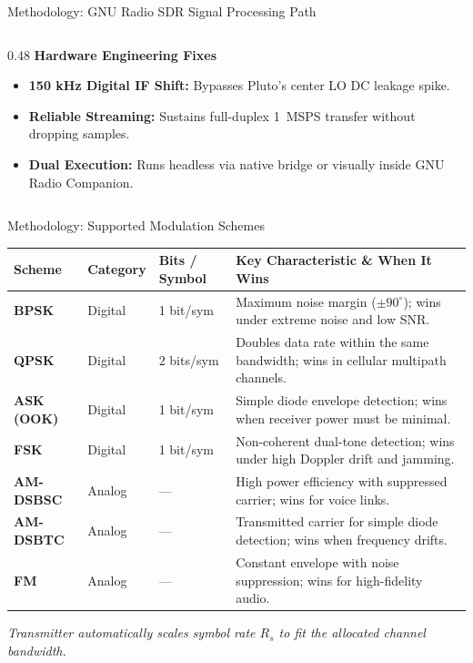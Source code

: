 \documentclass[aspectratio=169, 10pt]{beamer}
\begin{document}
\begin{frame}{Methodology: GNU Radio SDR Signal Processing Path}
\begin{columns}[T]
    \begin{column}{0.48\linewidth}
      \textbf{\color{primaryblue}\normalsize Hardware Engineering Fixes}\\[0.10cm]
      \begin{itemize}\setlength{\itemsep}{5pt}\small
        \item \textbf{150 kHz Digital IF Shift:} Bypasses Pluto's center LO DC leakage spike.
        \item \textbf{Reliable Streaming:} Sustains full-duplex 1~MSPS transfer without dropping samples.
        \item \textbf{Dual Execution:} Runs headless via native bridge or visually inside GNU Radio Companion.
      \end{itemize}
    \end{column}
  \end{columns}
\end{frame}

\begin{frame}{Methodology: Supported Modulation Schemes}
  \centering
  \small
  \begin{tabularx}{\textwidth}{p{2.2cm} p{1.6cm} p{1.6cm} X}
    \toprule
    \textbf{Scheme} & \textbf{Category} & \textbf{Bits / Symbol} & \textbf{Key Characteristic \& When It Wins} \\
    \midrule
    \textbf{BPSK} & Digital & 1 bit/sym & Maximum noise margin ($\pm 90^\circ$); wins under extreme noise and low SNR. \\
    \addlinespace
    \textbf{QPSK} & Digital & 2 bits/sym & Doubles data rate within the same bandwidth; wins in cellular multipath channels. \\
    \addlinespace
    \textbf{ASK (OOK)} & Digital & 1 bit/sym & Simple diode envelope detection; wins when receiver power must be minimal. \\
    \addlinespace
    \textbf{FSK} & Digital & 1 bit/sym & Non-coherent dual-tone detection; wins under high Doppler drift and jamming. \\
    \addlinespace
    \textbf{AM-DSBSC} & Analog & --- & High power efficiency with suppressed carrier; wins for voice links. \\
    \addlinespace
    \textbf{AM-DSBTC} & Analog & --- & Transmitted carrier for simple diode detection; wins when frequency drifts. \\
    \addlinespace
    \textbf{FM} & Analog & --- & Constant envelope with noise suppression; wins for high-fidelity audio. \\
    \bottomrule
  \end{tabularx}
  
  \vspace{0.35cm}
  \centering\small
  \textit{Transmitter automatically scales symbol rate $R_s$ to fit the allocated channel bandwidth.}
\end{frame}
\end{document}
